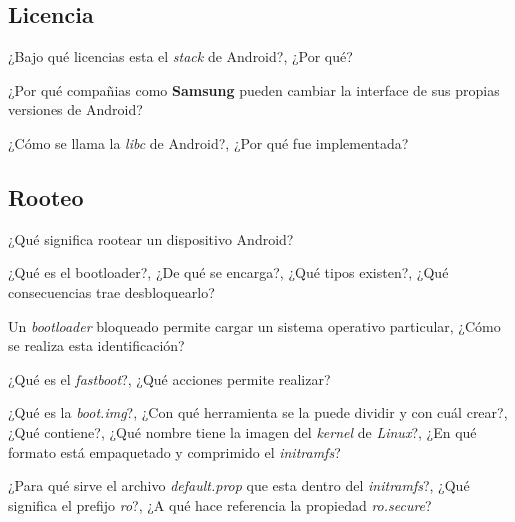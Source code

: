 \subsection{Licencia}
\begin{questions}
  \question ¿Bajo qué licencias esta el \textit{stack} de Android?, ¿Por qué?

  \question ¿Por qué compañias como \textbf{Samsung} pueden cambiar la interface de sus propias versiones de Android?
  
  \question ¿Cómo se llama la \textit{libc} de Android?, ¿Por qué fue implementada?
\end{questions}

\subsection{Rooteo}
\begin{questions}
  \question ¿Qué significa rootear un dispositivo Android?

  \question ¿Qué es el bootloader?, ¿De qué se encarga?, ¿Qué tipos existen?, ¿Qué consecuencias trae desbloquearlo?
  
  \question Un \textit{bootloader} bloqueado permite cargar un sistema operativo particular, ¿Cómo se realiza esta identificación?
  
  \question ¿Qué es el \textit{fastboot}?, ¿Qué acciones permite realizar?
  
  \question ¿Qué es la \textit{boot.img}?, ¿Con qué herramienta se la puede dividir y con cuál crear?, ¿Qué contiene?, ¿Qué nombre tiene la imagen del \textit{kernel} de \textit{Linux}?, ¿En qué formato está empaquetado y comprimido el \textit{initramfs}?
  
  \question ¿Para qué sirve el archivo \textit{default.prop} que esta dentro del \textit{initramfs}?, ¿Qué significa el prefijo \textit{ro}?, ¿A qué hace referencia la propiedad \textit{ro.secure}?
\end{questions}